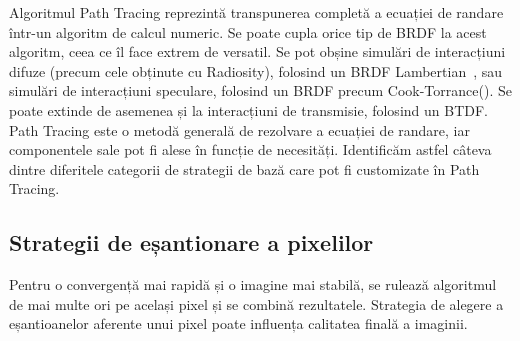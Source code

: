 \documentclass[12pt,a4paper]{report}
\numberwithin{equation}{section} %
\begin{document}
Algoritmul Path Tracing reprezintă transpunerea completă a ecuației de randare
într-un algoritm de calcul numeric. Se poate cupla orice tip de BRDF la acest
algoritm, ceea ce îl face extrem de versatil. Se pot obșine simulări de interacțiuni
difuze (precum cele obținute cu Radiosity), folosind un BRDF Lambertian~\cite{Lambert}, sau
simulări de interacțiuni speculare, folosind un BRDF precum Cook-Torrance(\cite{CookTorrance}).
Se poate extinde de asemenea și la interacțiuni de transmisie, folosind un BTDF.
Path Tracing este o metodă generală de rezolvare a ecuației de randare, iar componentele
sale pot fi alese în funcție de necesități. Identificăm astfel câteva dintre diferitele
categorii de strategii de bază care pot fi customizate în Path Tracing.

\subsection{Strategii de eșantionare a pixelilor}

Pentru o convergență mai rapidă și o imagine mai stabilă, se rulează algoritmul
de mai multe ori pe același pixel și se combină rezultatele. Strategia de alegere
a eșantioanelor aferente unui pixel poate influența calitatea finală a imaginii.
\end{document}

